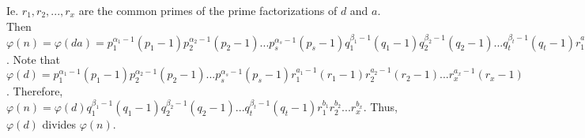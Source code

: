 \documentclass[12pt]{article}
\begin{document}
\begin{itemize}
Ie. $r_1, r_2, ..., r_x$ are the common primes of the prime factorizations of $d$ and $a$.
Then $\varphi(n) = \varphi(da) = p_1^{\alpha_1 - 1}(p_1 - 1)p_2^{\alpha_2 - 1}(p_2 - 1)...p_s^{\alpha_s - 1}(p_s - 1)q_1^{\beta_1 - 1}(q_1 - 1)q_2^{\beta_2 - 1}(q_2 - 1)...q_t^{\beta_t - 1}(q_t - 1)r_1^{a_1+b_1-1}(r_1 - 1)r_2^{a_2+b_2 - 1}(r_2 - 1)...r_x^{a_x+b_x - 1}(r_x - 1)$. Note that $\varphi(d) = p_1^{\alpha_1 - 1}(p_1 - 1)p_2^{\alpha_2 - 1}(p_2 - 1)...p_s^{\alpha_s - 1}(p_s - 1)r_1^{a_1-1}(r_1 - 1)r_2^{a_2 - 1}(r_2 - 1)...r_x^{a_x - 1}(r_x - 1)$. Therefore, $\varphi(n) = \varphi(d)q_1^{\beta_1 - 1}(q_1 - 1)q_2^{\beta_2 - 1}(q_2 - 1)...q_t^{\beta_t - 1}(q_t - 1)r_1^{b_1}r_2^{b_2}...r_x^{b_x}$. Thus, $\varphi(d)$ divides $\varphi(n)$.
\end{itemize}
\end{document}
